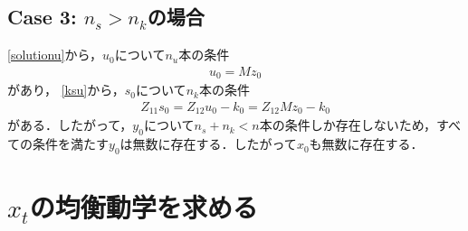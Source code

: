 \documentclass[a4j, dvipdfmx]{jarticle}
\begin{document}
\subsection{Case 3: $n_s > n_k$の場合}

\eqref{solutionu}から，$u_0$について$n_u$本の条件
\begin{align}
u_0 = Mz_0
\end{align}
があり，
\eqref{ksu}から，$s_0$について$n_k$本の条件
\begin{align}
Z_{11}s_0 = Z_{12}u_0 - k_0 = Z_{12}M z_0 - k_0
\end{align}
がある．したがって，$y_0$について$n_s + n_k < n$本の条件しか存在しないため，すべての条件を満たす$y_0$は無数に存在する．したがって$x_0$も無数に存在する．

\section{$x_t$の均衡動学を求める}
\end{document}
